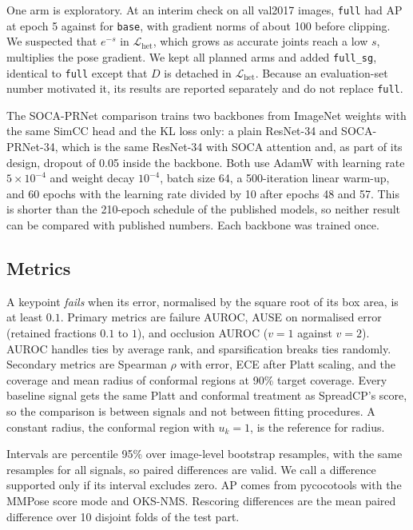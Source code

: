 \documentclass[preprint,11pt]{elsarticle}
\newcommand{\method}{SpreadCP}
\begin{document}
One arm is exploratory. At an interim check on all val2017 images, \texttt{full} had AP
\interimApFull{} at epoch 5 against \interimApBase{} for \texttt{base}, with gradient norms of
about 100 before clipping. We suspected that $e^{-s}$ in $\mathcal{L}_{\text{het}}$, which grows
as accurate joints reach a low $s$, multiplies the pose gradient. We kept all planned arms and
added \texttt{full\_sg}, identical to \texttt{full} except that $D$ is detached in
$\mathcal{L}_{\text{het}}$. Because an evaluation-set number motivated it, its results are
reported separately and do not replace \texttt{full}.

The SOCA-PRNet comparison trains two backbones from ImageNet weights with the same SimCC head and the
KL loss only: a plain ResNet-34 and SOCA-PRNet-34, which is the same ResNet-34 with SOCA attention and,
as part of its design, dropout of 0.05 inside the backbone. Both use AdamW with learning rate
$5\times10^{-4}$ and weight decay $10^{-4}$, batch size 64, a 500-iteration linear warm-up, and 60 epochs
with the learning rate divided by 10 after epochs 48 and 57. This is shorter than the 210-epoch schedule
of the published models, so neither result can be compared with published numbers. Each backbone was
trained once.

\subsection{Metrics}

A keypoint \emph{fails} when its error, normalised by the square root of its box area, is at
least $0.1$. Primary metrics are failure AUROC, AUSE on normalised error (retained fractions
$0.1$ to $1$), and occlusion AUROC ($v{=}1$ against $v{=}2$). AUROC handles ties by average rank,
and sparsification breaks ties randomly. Secondary metrics are Spearman $\rho$ with error, ECE
after Platt scaling, and the coverage and mean radius of conformal regions at 90\% target coverage.
Every baseline signal gets the same Platt and conformal treatment as \method{}'s score, so the
comparison is between signals and not between fitting procedures. A constant radius, the conformal
region with $u_k = 1$, is the reference for radius.

Intervals are percentile 95\% over \numBoot{} image-level bootstrap resamples, with the same
resamples for all signals, so paired differences are valid. We call a difference supported only
if its interval excludes zero. AP comes from pycocotools with the MMPose score mode and OKS-NMS.
Rescoring differences are the mean paired difference over 10 disjoint folds of the test part.
\end{document}
